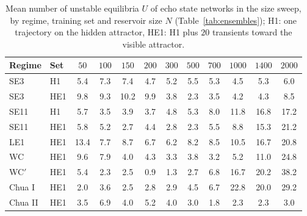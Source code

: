 \begin{table}
\caption{Mean number of unstable equilibria $U$ of echo state networks in the size sweep, by regime, training set and
reservoir size $N$ (Table~\ref{tab:ensembles}); H1: one trajectory on the hidden attractor, HE1: H1 plus $20$ transients toward the visible attractor.}
\label{tab:UN}
\begin{ruledtabular}
\begin{tabular}{llcccccccccc}
Regime & Set & $50$ & $100$ & $150$ & $200$ & $300$ & $500$ & $700$ & $1000$ & $1400$ & $2000$ \\
\hline
SE3 & H1 & 5.4 & 7.3 & 7.4 & 4.7 & 5.2 & 5.5 & 5.3 & 4.5 & 5.3 & 6.0 \\
SE3 & HE1 & 9.8 & 9.3 & 10.2 & 9.9 & 3.8 & 2.3 & 3.5 & 4.2 & 4.3 & 8.5 \\
SE11 & H1 & 5.7 & 3.5 & 3.9 & 3.7 & 4.8 & 5.3 & 8.0 & 11.8 & 16.8 & 17.2 \\
SE11 & HE1 & 5.8 & 5.2 & 2.7 & 4.4 & 2.8 & 2.3 & 5.5 & 8.8 & 15.3 & 21.2 \\
LE1 & HE1 & 13.4 & 7.7 & 8.7 & 6.7 & 6.2 & 8.2 & 8.5 & 10.5 & 16.7 & 20.8 \\
WC & HE1 & 9.6 & 7.9 & 4.0 & 4.3 & 3.3 & 3.8 & 3.2 & 5.2 & 11.0 & 24.8 \\
WC$'$ & HE1 & 5.4 & 2.3 & 2.5 & 0.9 & 1.3 & 2.7 & 6.8 & 16.7 & 20.2 & 38.2 \\
Chua I & HE1 & 2.0 & 3.6 & 2.5 & 2.8 & 2.9 & 4.5 & 6.7 & 22.8 & 20.0 & 29.2 \\
Chua II & HE1 & 3.5 & 6.9 & 4.0 & 5.2 & 4.0 & 3.0 & 1.8 & 2.3 & 2.3 & 3.0 \\
\end{tabular}
\end{ruledtabular}
\end{table}
